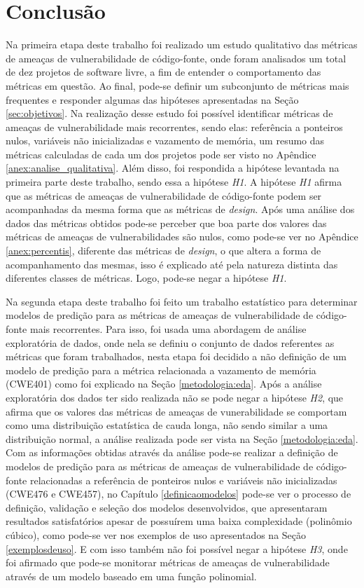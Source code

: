 \chapter{Conclusão} \label{chap:conclusao}

Na primeira etapa deste trabalho foi realizado um estudo qualitativo das
métricas de ameaças de vulnerabilidade de código-fonte, onde foram analisados um
total de dez projetos de software livre, a fim de entender o comportamento das
métricas em questão. Ao final, pode-se definir um subconjunto de métricas mais
frequentes e responder algumas das hipóteses apresentadas na Seção
\ref{sec:objetivos}. Na realização desse estudo foi possível identificar
métricas de ameaças de vulnerabilidade mais recorrentes, sendo elas: referência
a ponteiros nulos, variáveis não inicializadas e vazamento de memória, um resumo
das métricas calculadas de cada um dos projetos pode ser visto no Apêndice
\ref{anex:analise_qualitativa}. Além disso, foi respondida a hipótese levantada
na primeira parte deste trabalho, sendo essa a hipótese \textit{H1}. A hipótese
\textit{H1} afirma que as métricas de ameaças de vulnerabilidade de código-fonte
podem ser acompanhadas da mesma forma que as métricas de \textit{design}.
Após uma análise dos dados das métricas obtidos pode-se perceber que boa parte
dos valores das métricas de ameaças de vulnerabilidades são nulos, como pode-se
ver no Apêndice \ref{anex:percentis}, diferente das métricas de \textit{design},
o que altera a forma de acompanhamento das mesmas, isso é explicado até pela
natureza distinta das diferentes classes de métricas. Logo, pode-se negar a
hipótese \textit{H1}.

Na segunda etapa deste trabalho foi feito um trabalho estatístico para
determinar modelos de predição para as métricas de ameaças de vulnerabilidade de
código-fonte mais recorrentes. Para isso, foi usada uma abordagem de análise
exploratória de dados, onde nela se definiu o conjunto de dados referentes as
métricas que foram trabalhados, nesta etapa foi decidido a não definição de um
modelo de predição para a métrica relacionada a vazamento de memória (CWE401)
como foi explicado na Seção \ref{metodologia:eda}. Após a análise exploratória
dos dados ter sido realizada não se pode negar a hipótese \textit{H2}, que
afirma que os valores das métricas de ameaças de vunerabilidade se comportam
como uma distribuição estatística de cauda longa, não sendo similar a uma
distribuição normal, a análise realizada pode ser vista na Seção
\ref{metodologia:eda}. Com as informações obtidas através da análise pode-se
realizar a definição de modelos de predição para as métricas de ameaças de
vulnerabilidade de código-fonte relacionadas a referência de ponteiros nulos e
variáveis não inicializadas (CWE476 e CWE457), no Capítulo \ref{definicaomodelos}
pode-se ver o processo de definição, validação e seleção dos modelos
desenvolvidos, que apresentaram resultados satisfatórios apesar de possuírem uma
baixa complexidade (polinômio cúbico), como pode-se ver nos exemplos de uso
apresentados na Seção \ref{exemplosdeuso}. E com isso também não foi possível
negar a hipótese \textit{H3}, onde foi afirmado que pode-se monitorar métricas
de ameaças de vulnerabilidade através de um modelo baseado em uma função
polinomial.

